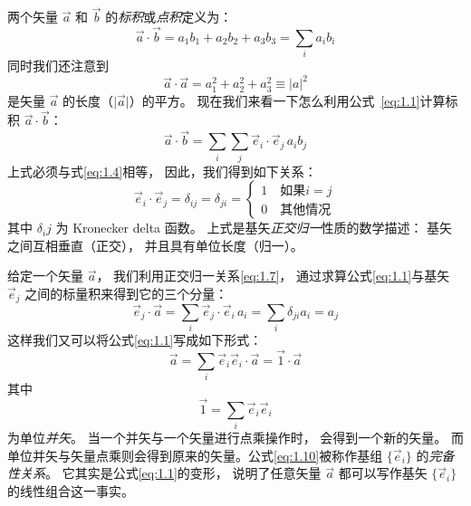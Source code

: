 两个矢量 $\vec{a}$ 和 $\vec{b}$ 的\emph{标积}或\emph{点积}定义为：
\begin{equation}
 \vec{a}\cdot\vec{b} = a_1 b_1 + a_2 b_2 + a_3 b_3 = \sum_i a_i b_i
 \label{eq:1.4}
\end{equation}
同时我们还注意到
\begin{equation}
 \vec{a}\cdot\vec{a} = a_1^2 + a_2^2 + a_3^2 \equiv \vert a\vert^2
 \label{eq:1.5}
\end{equation}
是矢量 $\vec{a}$ 的长度（$\vert \vec{a}\vert$）的平方。
现在我们来看一下怎么利用公式~\eqref{eq:1.1}计算标积 $\vec{a}\cdot\vec{b}$：
\begin{equation}
 \vec{a}\cdot\vec{b} = \sum_i\sum_j \vec{e}_i\cdot\vec{e}_j\, a_i b_j
 \label{eq:1.6}
\end{equation}
上式必须与式\eqref{eq:1.4}相等，
因此，我们得到如下关系：
\begin{equation}
 \vec{e}_i \cdot \vec{e}_j = \delta_{ij} = \delta_{ji} = 
          \begin{cases}
           1 \quad \text{如果$i=j$} \\
                    0 \quad \text{其他情况}
 \end{cases}
 \label{eq:1.7}
\end{equation}
其中 $\delta_ij$ 为 Kronecker delta 函数。
上式是基矢\emph{正交归一}性质的数学描述：
基矢之间互相垂直（正交），
并且具有单位长度（归一）。 

给定一个矢量 $\vec{a}$，
我们利用正交归一关系\eqref{eq:1.7}，
通过求算公式\eqref{eq:1.1}与基矢 $\vec{e}_j$ 之间的标量积来得到它的三个分量：
\begin{equation}
 \vec{e}_j \cdot \vec{a} = \sum_i \vec{e}_j \cdot \vec{e}_i\, a_i = \sum_i \delta_{ji} a_i = a_j
 \label{eq:1.8}
\end{equation}
这样我们又可以将公式\eqref{eq:1.1}写成如下形式：
\begin{equation}
 \vec{a} = \sum_i \vec{e}_i\vec{e}_i \cdot \vec{a} = \vec{1}\cdot\vec{a}
 \label{eq:1.9}
\end{equation}
其中
\begin{equation}
 \vec{1} = \sum_i \vec{e}_i \vec{e}_i
 \label{eq:1.10}
\end{equation}
为单位\emph{并矢}。
当一个并矢与一个矢量进行点乘操作时，
会得到一个新的矢量。
而单位并矢与矢量点乘则会得到原来的矢量。公式\eqref{eq:1.10}被称作基组 $\{\vec{e}_i\}$ 的\emph{完备性关系}。
它其实是公式\eqref{eq:1.1}的变形，
说明了任意矢量 $\vec{a}$ 都可以写作基矢
$\{\vec{e}_i\}$ 的线性组合这一事实。

